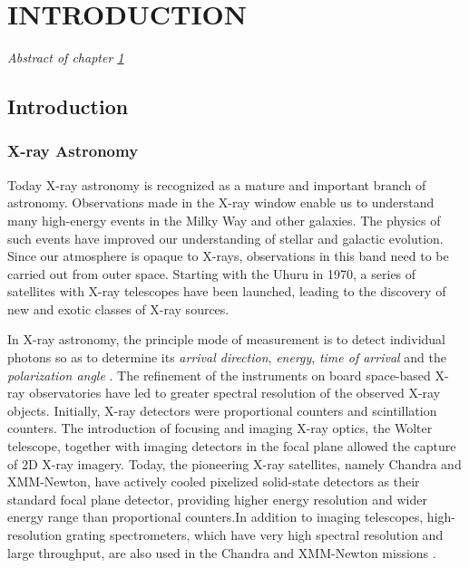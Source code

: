 \chapter{INTRODUCTION} \label{chap:introduction}
    \minitoc
    \emph{Abstract of chapter \ref{chap:introduction}}
    
    \section{Introduction} \label{introduction:introduction}
        
        \subsection{X-ray Astronomy} \label{introduction:introduction:x-ray-astro}
        	Today X-ray astronomy is recognized as a mature and important branch of astronomy. Observations made in the X-ray window enable us to understand many high-energy events in the Milky Way and other galaxies. The physics of such events have improved our understanding of stellar and galactic evolution. Since our atmosphere is opaque to X-rays, observations in this band need to be carried out from outer space. Starting with the Uhuru in 1970, a series of satellites with X-ray telescopes have been launched, leading to the discovery of new and exotic classes of X-ray sources.
        	
        	In X-ray astronomy, the principle mode of measurement is to detect individual photons so as to determine its \emph{arrival direction}, \emph{energy}, \emph{time of arrival} and the \emph{polarization angle} \cite{overviewXrays}. The refinement of the instruments on board space-based X-ray observatories have led to greater spectral resolution of the observed X-ray objects. Initially, X-ray detectors were proportional counters and scintillation counters. The introduction of focusing and imaging X-ray optics, the Wolter telescope, together with imaging detectors in the focal plane allowed the capture of 2D X-ray imagery. Today, the pioneering X-ray satellites, namely Chandra and XMM-Newton, have actively cooled pixelized solid-state detectors as their standard focal plane detector, providing higher energy resolution and wider energy range than proportional counters.In addition to imaging telescopes, high-resolution grating spectrometers, which have very high spectral resolution and large throughput, are also used in the Chandra and XMM-Newton missions \cite{paragb2017rev}.
        
